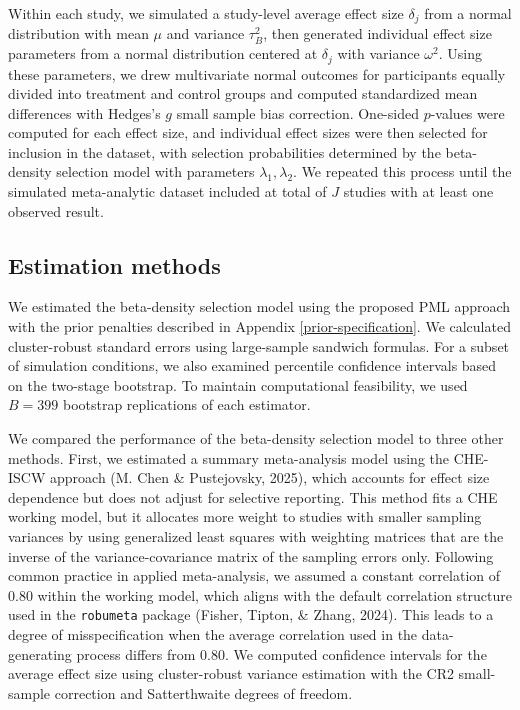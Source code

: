 \documentclass[
  american,
  man, donotrepeattitle,floatsintext]{apa7}
\begin{document}
Within each study, we simulated a study-level average effect size \(\delta_j\) from a normal distribution with mean \(\mu\) and variance \(\tau^2_B\), then generated individual effect size parameters from a normal distribution centered at \(\delta_j\) with variance \(\omega^2\). Using these parameters, we drew multivariate normal outcomes for participants equally divided into treatment and control groups and computed standardized mean differences with Hedges's \(g\) small sample bias correction. One-sided \(p\)-values were computed for each effect size, and individual effect sizes were then selected for inclusion in the dataset, with selection probabilities determined by the beta-density selection model with parameters \(\lambda_1,\lambda_2\).
We repeated this process until the simulated meta-analytic dataset included at total of \(J\) studies with at least one observed result.

\subsection{Estimation methods}\label{estimation-methods}

We estimated the beta-density selection model using the proposed PML approach with the prior penalties described in Appendix \ref{prior-specification}.
We calculated cluster-robust standard errors using large-sample sandwich formulas. For a subset of simulation conditions, we also examined percentile confidence intervals based on the two-stage bootstrap. To maintain computational feasibility, we used \(B = 399\) bootstrap replications of each estimator.

We compared the performance of the beta-density selection model to three other methods.
First, we estimated a summary meta-analysis model using the CHE-ISCW approach (M. Chen \& Pustejovsky, 2025), which accounts for effect size dependence but does not adjust for selective reporting.
This method fits a CHE working model, but it allocates more weight to studies with smaller sampling variances by using generalized least squares with weighting matrices that are the inverse of the variance-covariance matrix of the sampling errors only.
Following common practice in applied meta-analysis, we assumed a constant correlation of 0.80 within the working model, which aligns with the default correlation structure used in the \texttt{robumeta} package (Fisher, Tipton, \& Zhang, 2024). This leads to a degree of misspecification when the average correlation used in the data-generating process differs from 0.80.
We computed confidence intervals for the average effect size using cluster-robust variance estimation with the CR2 small-sample correction and Satterthwaite degrees of freedom.
\end{document}
